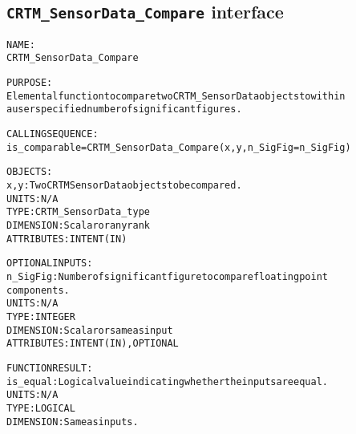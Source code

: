 \subsection{\texttt{CRTM\_SensorData\_Compare} interface}
  \label{sec:CRTM_SensorData_Compare_interface}
  \begin{alltt}
  NAME:
        CRTM_SensorData_Compare
 
  PURPOSE:
        Elemental function to compare two CRTM_SensorData objects to within
        a user specified number of significant figures.
 
  CALLING SEQUENCE:
        is_comparable = CRTM_SensorData_Compare( x, y, n_SigFig=n_SigFig )
 
  OBJECTS:
        x, y:          Two CRTM SensorData objects to be compared.
                       UNITS:      N/A
                       TYPE:       CRTM_SensorData_type
                       DIMENSION:  Scalar or any rank
                       ATTRIBUTES: INTENT(IN)
 
  OPTIONAL INPUTS:
        n_SigFig:      Number of significant figure to compare floating point
                       components.
                       UNITS:      N/A
                       TYPE:       INTEGER
                       DIMENSION:  Scalar or same as input
                       ATTRIBUTES: INTENT(IN), OPTIONAL
 
  FUNCTION RESULT:
        is_equal:      Logical value indicating whether the inputs are equal.
                       UNITS:      N/A
                       TYPE:       LOGICAL
                       DIMENSION:  Same as inputs.
  \end{alltt}

